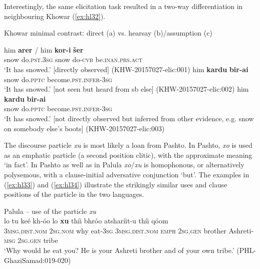 \documentclass[output=paper]{langsci/langscibook}
\begin{document}
Interestingly, the same elicitation task resulted in a two-way differentiation in neighbouring Khowar ‎(\ref{ex:hl32}).

\begin{exe}
\ex Khowar minimal contrastː direct (a) vs. hearsay (b)/assumption (c) \label{ex:hl32}
	\begin{xlist}
	\ex 
	\gll him \textbf{arer} /  him \textbf{kor-i} \textbf{šer}\\
	snow do.\textsc{pst}.3\textsc{sg} {} snow do-\textsc{cvb} be.\textsc{inan}.\textsc{prs}.\textsc{act}\\
	\trans ‘It has snowed.’ [directly observed] (KHW-20157027-elic:001)
	\ex 
	\gll him \textbf{kardu} \textbf{bir-ai}\\
	snow do.\textsc{pptc} become.\textsc{pst}.\textsc{infer}-3\textsc{sg}\\
	\trans ‘It has snowed.’ [not seen but heard from sb else] (KHW-20157027-elic:002)
	\ex 
	\gll him \textbf{kardu} \textbf{bir-ai}\\
	snow do.\textsc{pptc} become.\textsc{pst.infer}-3\textsc{sg}\\
	\trans ‘It has snowed.’ [not directly observed but inferred from other evidence, e.g. snow on somebody else’s boots] (KHW-20157027-elic:003)
	\end{xlist}
\end{exe}

The discourse particle \textit{xu} is most likely a loan from Pashto. In Pashto, \textit{xo} is used as an emphatic particle (a second position clitic), with the approximate meaning ‘in fact’. In Pashto as well as in Palula \textit{xo}/\textit{xu} is homophonous, or alternatively polysemous, with a clause-initial adversative conjunction ‘but’. The examples in ‎(\ref{ex:hl33}) and ‎(\ref{ex:hl34}) illustrate the strikingly similar uses and clause positions of the particle in the two languages.


\begin{exe}
\ex Palula -- use of the particle \textit{xu} \label{ex:hl33}\\
	\gll lo tu keé kh-óo lo \textbf{xu} thíi bhróo atsharíit-u thíi qóom\\
	3\textsc{msg}.\textsc{dist}.\textsc{nom} 2\textsc{sg}.\textsc{nom} why eat-3\textsc{sg} 3\textsc{msg}.\textsc{dist}.\textsc{nom} \textsc{emph} 2\textsc{sg}.\textsc{gen} brother Ashreti-\textsc{msg} 2\textsc{sg}.\textsc{gen} tribe\\
	\trans ‘Why would he eat you? He is your Ashreti brother and of your own tribe.’ (PHL-GhaziSamad:019-020)
\end{exe}
\end{document}
